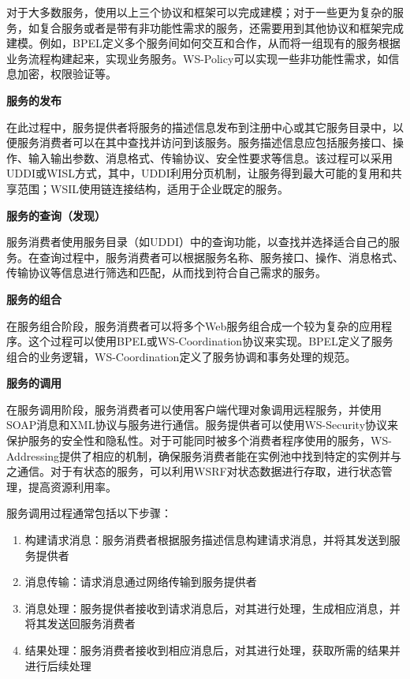\begin{solution}
对于大多数服务，使用以上三个协议和框架可以完成建模；对于一些更为复杂的服务，如复合服务或者是带有非功能性需求的服务，还需要用到其他协议和框架完成建模。例如，BPEL定义多个服务间如何交互和合作，从而将一组现有的服务根据业务流程构建起来，实现业务服务。WS-Policy可以实现一些非功能性需求，如信息加密，权限验证等。

\textbf{服务的发布}\par
在此过程中，服务提供者将服务的描述信息发布到注册中心或其它服务目录中，以便服务消费者可以在其中查找并访问到该服务。服务描述信息应包括服务接口、操作、输入输出参数、消息格式、传输协议、安全性要求等信息。该过程可以采用UDDI或WISL方式，其中，UDDI利用分页机制，让服务得到最大可能的复用和共享范围；WSIL使用链连接结构，适用于企业既定的服务。

\textbf{服务的查询（发现）}\par
服务消费者使用服务目录（如UDDI）中的查询功能，以查找并选择适合自己的服务。在查询过程中，服务消费者可以根据服务名称、服务接口、操作、消息格式、传输协议等信息进行筛选和匹配，从而找到符合自己需求的服务。

\textbf{服务的组合}\par
在服务组合阶段，服务消费者可以将多个Web服务组合成一个较为复杂的应用程序。这个过程可以使用BPEL或WS-Coordination协议来实现。BPEL定义了服务组合的业务逻辑，WS-Coordination定义了服务协调和事务处理的规范。

\textbf{服务的调用}\par
在服务调用阶段，服务消费者可以使用客户端代理对象调用远程服务，并使用SOAP消息和XML协议与服务进行通信。服务提供者可以使用WS-Security协议来保护服务的安全性和隐私性。对于可能同时被多个消费者程序使用的服务，WS-Addressing提供了相应的机制，确保服务消费者能在实例池中找到特定的实例并与之通信。对于有状态的服务，可以利用WSRF对状态数据进行存取，进行状态管理，提高资源利用率。

服务调用过程通常包括以下步骤：
\begin{enumerate}[label=\arabic*.]
    \item 构建请求消息：服务消费者根据服务描述信息构建请求消息，并将其发送到服务提供者
    \item 消息传输：请求消息通过网络传输到服务提供者
    \item 消息处理：服务提供者接收到请求消息后，对其进行处理，生成相应消息，并将其发送回服务消费者
    \item 结果处理：服务消费者接收到相应消息后，对其进行处理，获取所需的结果并进行后续处理
\end{enumerate}

\end{solution}